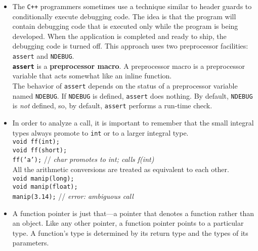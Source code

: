 \begin{itemize}
\item
The \texttt{C++} programmers sometimes use a technique similar to header guards to conditionally execute debugging code. The idea is that the program will contain debugging code that is executed only while the program is being developed. When the application is completed and ready to ship, the debugging code is turned off. This approach uses two preprocessor facilities: \texttt{assert} and \texttt{NDEBUG}.\\
\textbf{\texttt{assert}} is a \textbf{preprocessor macro}. A preprocessor macro is a preprocessor variable that acts somewhat like an inline function.\\
The behavior of \texttt{assert} depends on the status of a preprocessor variable named \texttt{NDEBUG}. If \texttt{NDEBUG} is defined, \texttt{assert} does nothing. By default, \texttt{NDEBUG} is \textit{not} defined, so, by default, \texttt{assert} performs a run-time check.

\item
In order to analyze a call, it is important to remember that the small integral types always promote to \texttt{int} or to a larger integral type.\\
\hspace*{1em}\texttt{void ff(int);}\\
\hspace*{1em}\texttt{void ff(short);}\\
\hspace*{1em}\texttt{ff('a');} // \textit{char promotes to int; calls f(int)}\\
All the arithmetic conversions are treated as equivalent to each other.\\
\hspace*{1em}\texttt{void manip(long);}\\
\hspace*{1em}\texttt{void manip(float);}\\
\hspace*{1em}\texttt{manip(3.14);} // \textit{error: ambiguous call}

\item
A function pointer is just that---a pointer that denotes a function rather than an object. Like any other pointer, a function pointer points to a particular type. A function's type is determined by its return type and the types of its parameters.


















\end{itemize}